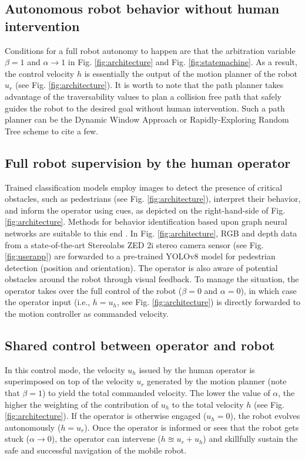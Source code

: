 \documentclass[letterpaper, 10 pt, conference]{ieeeconf}  %
\begin{document}
\subsection{Autonomous robot behavior without human intervention}
Conditions for a full robot autonomy to happen are that the arbitration variable $\beta=1$ and $\alpha\rightarrow 1$ in 	Fig. \ref{fig:architecture} and Fig. \ref{fig:statemachine}. As a result, the control velocity $h$ is essentially the output of the motion planner of the  robot $u_r$ (see Fig. \ref{fig:architecture}). It is worth to note that the path planner takes advantage of the traversability values to plan a collision free path that safely guides  the robot to the desired goal without human intervention.  Such a path planner can be the Dynamic Window Approach or  Rapidly-Exploring Random Tree scheme  \cite{leung2022hybrid} to cite a few.

\subsection{Full robot supervision by the human operator}
Trained classification models employ images to detect the presence of critical obstacles, such as pedestrians (see Fig. \ref{fig:architecture}), interpret their behavior, and inform the operator using cues, as depicted on the right-hand-side of Fig. \ref{fig:architecture}. Methods for behavior identification based upon graph neural networks are suitable to this end \cite{jang2024multi}. In Fig. \ref{fig:architecture}, RGB and depth data from a state-of-the-art Stereolabs ZED 2i stereo camera sensor (see 	Fig. \ref{fig:userapp}) are forwarded to a pre-trained YOLOv8 model for pedestrian detection (position and orientation). The operator is also aware of potential obstacles around the robot  through visual feedback. To manage the situation, the operator takes over the full control of the robot ($\beta = 0$ and $\alpha = 0$), in which case the operator input (i.e., $h=u_h$, see Fig. \ref{fig:architecture}) is directly forwarded to the motion controller as commanded velocity.

\subsection{Shared control between operator and robot}
In this control mode, the velocity $u_h$ issued by the human operator  is superimposed on top of the velocity $u_r$ generated by the motion planner (note that $\beta = 1$) to yield the  total commanded velocity.  The lower the  value of $\alpha$, the higher the weighting of the contribution  of $u_h$ to the total velocity $h$ (see Fig. \ref{fig:architecture}). If the operator is otherwise engaged ($u_h=0$), the robot evolves autonomously ($h=u_r$). Once the operator is informed or sees that the robot gets stuck ($\alpha \rightarrow 0$), the operator can intervene ($h\approxeq u_r + u_h$) and skillfully sustain the safe and successful navigation of the mobile robot. 
\end{document}
